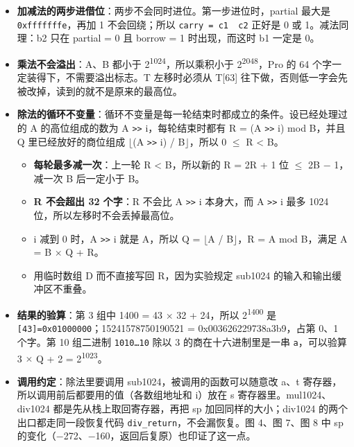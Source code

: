 \documentclass[11pt,a4paper]{ctexart}
\providecommand{\tightlist}{\setlength{\itemsep}{0pt}\setlength{\parskip}{0pt}}
\begin{document}
\begin{itemize}
\tightlist
\item
  \textbf{加减法的两步进借位}：两步不会同时进位。第一步进位时，partial
  最大是 \texttt{0xfffffffe}，再加 1 不会回绕；所以
  \texttt{carry\ =\ c1\ \textbar{}\ c2} 正好是 0 或 1。减法同理：b2 只在
  partial = 0 且 borrow = 1 时出现，而这时 b1 一定是 0。
\item
  \textbf{乘法不会溢出}：A、B 都小于
  2\textsuperscript{1024}，所以乘积小于 2\textsuperscript{2048}，Pro 的
  64 个字一定装得下，不需要溢出标志。T 左移时必须从 T{[}63{]}
  往下做，否则低一字会先被改掉，读到的就不是原来的最高位。
\item
  \textbf{除法的循环不变量}：循环不变量是每一轮结束时都成立的条件。设已经处理过的
  A 的高位组成的数为 A \texttt{>{}>} i，每轮结束时都有 R = (A
  \texttt{>{}>} i) mod B，并且 Q 里已经放好的商位组成
  \ensuremath{\lfloor}(A \texttt{>{}>} i) / B\ensuremath{\rfloor}，所以
  0 \ensuremath{\leq} R \textless{} B。

  \begin{itemize}
  \tightlist
  \item
    \textbf{每轮最多减一次}：上一轮 R \textless{} B，所以新的 R = 2R + 1
    位 \ensuremath{\leq} 2B \ensuremath{-} 1，减一次 B 后一定小于 B。
  \item
    \textbf{R 不会超出 32 个字}：R 不会比 A \texttt{>{}>} i 本身大，而 A
    \texttt{>{}>} i 最多 1024 位，所以左移时不会丢掉最高位。
  \item
    i 减到 0 时，A \texttt{>{}>} i 就是 A，所以 Q =
    \ensuremath{\lfloor}A / B\ensuremath{\rfloor}，R = A mod B，满足 A =
    B \ensuremath{\times} Q + R。
  \item
    用临时数组 D 而不直接写回 R，因为实验规定 sub1024
    的输入和输出缓冲区不重叠。
  \end{itemize}
\item
  \textbf{结果的验算}：第 3 组中 1400 = 43 \ensuremath{\times} 32 +
  24，所以 2\textsuperscript{1400} 是
  \texttt{{[}43{]}=0x01000000}；15241578750190521 =
  0x003626229738a3b9，占第 0、1 个字。第 10 组二进制 \texttt{1010…10}
  除以 3 的商在十六进制里是一串 \texttt{a}，可以验算 3
  \ensuremath{\times} Q + 2 = 2\textsuperscript{1023}。
\item
  \textbf{调用约定}：除法里要调用 sub1024，被调用的函数可以随意改 a、t
  寄存器，所以调用前后都要用的值（各数组地址和 i）放在 s
  寄存器里。mul1024、div1024 都是先从栈上取回寄存器，再把 sp
  加回同样的大小；div1024 的两个出口都走同一段恢复代码
  \texttt{div\_return}，不会漏恢复。图 4、图 7、图 8 中 sp
  的变化（\ensuremath{-}272、\ensuremath{-}160，返回后复原）也印证了这一点。
\end{itemize}
\end{document}
